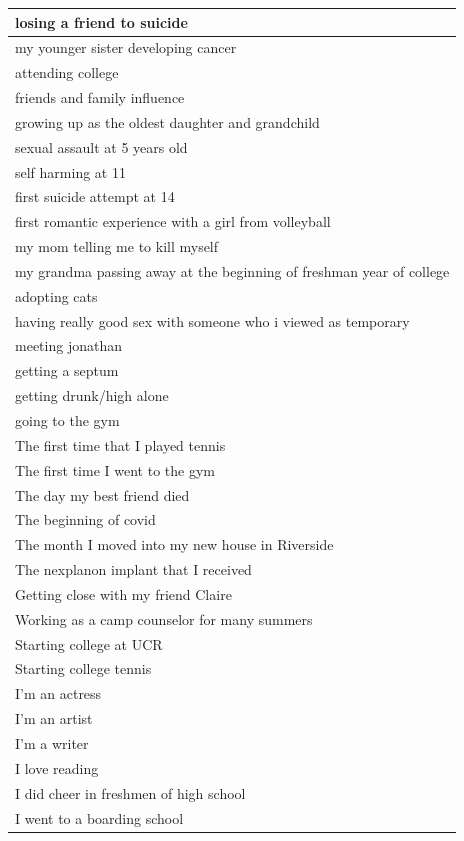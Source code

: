\documentclass[
  .7em,
  letterpaper,
  DIV=11,
  numbers=noendperiod]{scrartcl}
\begin{document}
\begin{table}
\begin{tabular}{l}
\hline
losing a friend to suicide\\
\hline
my younger sister developing cancer\\
\hline
attending college\\
\hline
friends and family influence\\
\hline
growing up as the oldest daughter and grandchild\\
\hline
sexual assault at 5 years old\\
\hline
self harming at 11\\
\hline
first suicide attempt at 14\\
\hline
first romantic experience with a girl from volleyball\\
\hline
my mom telling me to kill myself\\
\hline
my grandma passing away at the beginning of freshman year of college\\
\hline
adopting cats\\
\hline
having really good sex with someone who i viewed as temporary\\
\hline
meeting jonathan\\
\hline
getting a septum\\
\hline
getting drunk/high alone\\
\hline
going to the gym\\
\hline
The first time that I played tennis\\
\hline
The first time I went to the gym\\
\hline
The day my best friend died\\
\hline
The beginning of covid\\
\hline
The month I moved into my new house in Riverside\\
\hline
The nexplanon implant that I received\\
\hline
Getting close with my friend Claire\\
\hline
Working as a camp counselor for many summers\\
\hline
Starting college at UCR\\
\hline
Starting college tennis\\
\hline
I'm an actress\\
\hline
I'm an artist\\
\hline
I'm a writer\\
\hline
I love reading\\
\hline
I did cheer in freshmen of high school\\
\hline
I went to a boarding school\\

\end{tabular}
\end{table}
\end{document}
